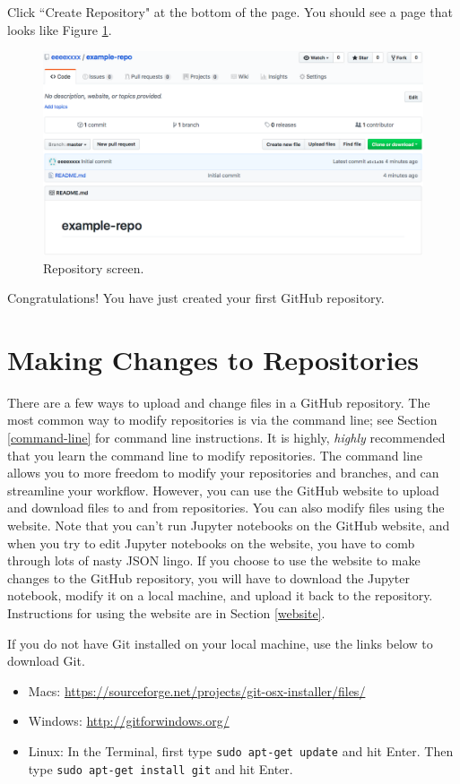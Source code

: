 \documentclass[11pt,a4paper]{article}
\begin{document}
Click ``Create Repository" at the bottom of the page.
You should see a page that looks like Figure \ref{fig:repo-screen}.

\begin{figure}[h]
\centering
\includegraphics[width=.7\textwidth]{figures/repo_screen.png}
\caption{Repository screen.}
\label{fig:repo-screen}
\end{figure}

Congratulations!
You have just created your first GitHub repository.

\section{Making Changes to Repositories}
There are a few ways to upload and change files in a GitHub repository.
The most common way to modify repositories is via the command line; see Section \ref{command-line} for command line instructions.
It is highly, \textit{highly} recommended that you learn the command line to modify repositories.
The command line allows you to more freedom to modify your repositories and branches, and can streamline your workflow.
However, you can use the GitHub website to upload and download files to and from repositories.
You can also modify files using the website.
Note that you can't run Jupyter notebooks on the GitHub website, and when you try to edit Jupyter notebooks on the website, you have to comb through lots of nasty JSON lingo.
If you choose to use the website to make changes to the GitHub repository, you will have to download the Jupyter notebook, modify it on a local machine, and upload it back to the repository.
Instructions for using the website are in Section \ref{website}.

If you do not have Git installed on your local machine, use the links below to download Git.
\begin{itemize}
\item[] Macs: \url{https://sourceforge.net/projects/git-osx-installer/files/}
\item[] Windows: \url{http://gitforwindows.org/}
\item[] Linux: In the Terminal, first type \texttt{sudo apt-get update} and hit Enter. Then type \texttt{sudo apt-get install git} and hit Enter.
\end{itemize} 
\end{document}
